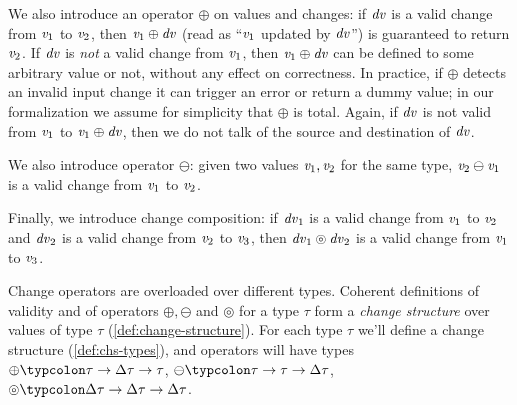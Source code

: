 We also introduce an operator \ensuremath{\oplus } on values and changes: if
\ensuremath{\Varid{dv}} is a valid change from \ensuremath{\Varid{v}_{1}} to \ensuremath{\Varid{v}_{2}}, then \ensuremath{\Varid{v}_{1}\oplus \Varid{dv}}
(read as ``\ensuremath{\Varid{v}_{1}} updated by \ensuremath{\Varid{dv}}'') is guaranteed to return \ensuremath{\Varid{v}_{2}}.
If \ensuremath{\Varid{dv}} is \emph{not} a valid change from \ensuremath{\Varid{v}_{1}}, then \ensuremath{\Varid{v}_{1}\oplus \Varid{dv}} can be
defined to some arbitrary value or not, without any effect on correctness. In
practice, if \ensuremath{\oplus } detects an invalid input change it can trigger an error or
return a dummy value; in our formalization we assume for simplicity that
\ensuremath{\oplus } is total.
Again, if \ensuremath{\Varid{dv}} is not valid from \ensuremath{\Varid{v}_{1}} to \ensuremath{\Varid{v}_{1}\oplus \Varid{dv}}, then we do not talk of
the source and destination of \ensuremath{\Varid{dv}}.

We also introduce operator \ensuremath{\ominus }: given two values \ensuremath{\Varid{v}_{1},\Varid{v}_{2}}
for the same type, \ensuremath{\Varid{v}_{2}\ominus \Varid{v}_{1}} is a valid change from \ensuremath{\Varid{v}_{1}}
to \ensuremath{\Varid{v}_{2}}.

Finally, we introduce change composition: if \ensuremath{\Varid{dv}_{1}} is a valid
change from \ensuremath{\Varid{v}_{1}} to \ensuremath{\Varid{v}_{2}} and \ensuremath{\Varid{dv}_{2}} is a valid change from \ensuremath{\Varid{v}_{2}} to
\ensuremath{\Varid{v}_{3}}, then \ensuremath{\Varid{dv}_{1}\circledcirc\Varid{dv}_{2}} is a valid change from \ensuremath{\Varid{v}_{1}} to
\ensuremath{\Varid{v}_{3}}.

Change operators are overloaded over different types.
Coherent definitions of validity and of operators \ensuremath{\oplus ,\ominus } and
\ensuremath{\circledcirc } for a type \ensuremath{\tau} form a \emph{change structure} over values of type
\ensuremath{\tau} (\cref{def:change-structure}).
For each type \ensuremath{\tau} we'll define a change structure (\cref{def:chs-types}),
and operators will have types \ensuremath{\oplus \typcolon\tau\to \Delta \tau\to \tau}, \ensuremath{\ominus \typcolon\tau\to \tau\to \Delta \tau}, \ensuremath{\circledcirc \typcolon\Delta \tau\to \Delta \tau\to \Delta \tau}.

